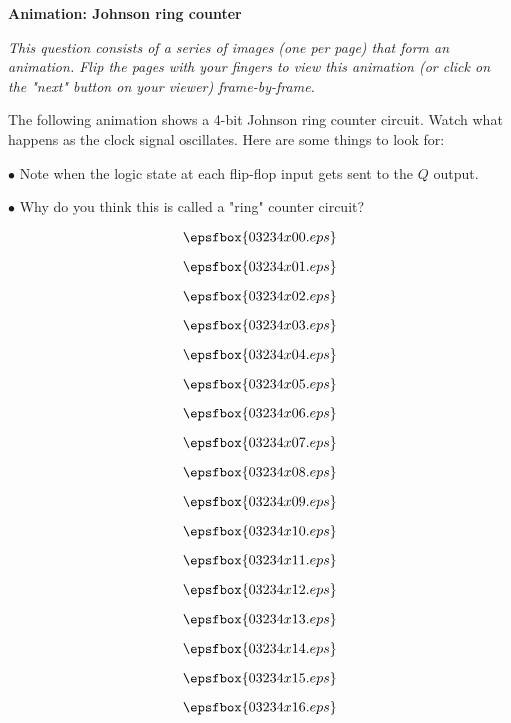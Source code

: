 

\centerline{\bf Animation: Johnson ring counter}

\vskip 10pt

{\it This question consists of a series of images (one per page) that form an animation.  Flip the pages with your fingers to view this animation (or click on the "next" button on your viewer) frame-by-frame.}

\vskip 10pt

The following animation shows a 4-bit Johnson ring counter circuit.  Watch what happens as the clock signal oscillates.  Here are some things to look for:

\medskip
\goodbreak
\item{$\bullet$} Note when the logic state at each flip-flop input gets sent to the $Q$ output.
\item{$\bullet$} Why do you think this is called a "ring" counter circuit?
\medskip

\vfil \eject
$$\epsfbox{03234x00.eps}$$

\vfil \eject
$$\epsfbox{03234x01.eps}$$

\vfil \eject
$$\epsfbox{03234x02.eps}$$

\vfil \eject
$$\epsfbox{03234x03.eps}$$

\vfil \eject
$$\epsfbox{03234x04.eps}$$

\vfil \eject
$$\epsfbox{03234x05.eps}$$

\vfil \eject
$$\epsfbox{03234x06.eps}$$

\vfil \eject
$$\epsfbox{03234x07.eps}$$

\vfil \eject
$$\epsfbox{03234x08.eps}$$

\vfil \eject
$$\epsfbox{03234x09.eps}$$

\vfil \eject
$$\epsfbox{03234x10.eps}$$

\vfil \eject
$$\epsfbox{03234x11.eps}$$

\vfil \eject
$$\epsfbox{03234x12.eps}$$

\vfil \eject
$$\epsfbox{03234x13.eps}$$

\vfil \eject
$$\epsfbox{03234x14.eps}$$

\vfil \eject
$$\epsfbox{03234x15.eps}$$

\vfil \eject
$$\epsfbox{03234x16.eps}$$

